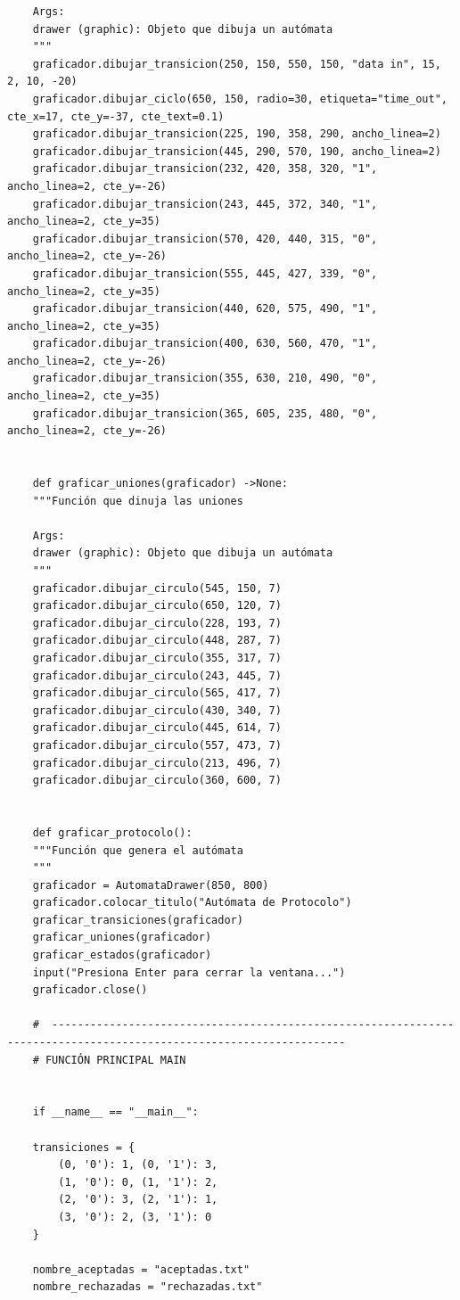 \documentclass[11pt]{article} %
\begin{document}
\begin{lstlisting}
	Args:
	drawer (graphic): Objeto que dibuja un autómata
	"""
	graficador.dibujar_transicion(250, 150, 550, 150, "data in", 15, 2, 10, -20)
	graficador.dibujar_ciclo(650, 150, radio=30, etiqueta="time_out", cte_x=17, cte_y=-37, cte_text=0.1)
	graficador.dibujar_transicion(225, 190, 358, 290, ancho_linea=2)
	graficador.dibujar_transicion(445, 290, 570, 190, ancho_linea=2)
	graficador.dibujar_transicion(232, 420, 358, 320, "1", ancho_linea=2, cte_y=-26)
	graficador.dibujar_transicion(243, 445, 372, 340, "1", ancho_linea=2, cte_y=35)
	graficador.dibujar_transicion(570, 420, 440, 315, "0", ancho_linea=2, cte_y=-26)
	graficador.dibujar_transicion(555, 445, 427, 339, "0", ancho_linea=2, cte_y=35)
	graficador.dibujar_transicion(440, 620, 575, 490, "1", ancho_linea=2, cte_y=35)
	graficador.dibujar_transicion(400, 630, 560, 470, "1", ancho_linea=2, cte_y=-26)
	graficador.dibujar_transicion(355, 630, 210, 490, "0", ancho_linea=2, cte_y=35)
	graficador.dibujar_transicion(365, 605, 235, 480, "0", ancho_linea=2, cte_y=-26)
	
	
	def graficar_uniones(graficador) ->None:
	"""Función que dinuja las uniones
	
	Args:
	drawer (graphic): Objeto que dibuja un autómata
	"""
	graficador.dibujar_circulo(545, 150, 7)
	graficador.dibujar_circulo(650, 120, 7)
	graficador.dibujar_circulo(228, 193, 7)
	graficador.dibujar_circulo(448, 287, 7)
	graficador.dibujar_circulo(355, 317, 7)
	graficador.dibujar_circulo(243, 445, 7)
	graficador.dibujar_circulo(565, 417, 7)
	graficador.dibujar_circulo(430, 340, 7)
	graficador.dibujar_circulo(445, 614, 7)
	graficador.dibujar_circulo(557, 473, 7)
	graficador.dibujar_circulo(213, 496, 7)
	graficador.dibujar_circulo(360, 600, 7)
	
	
	def graficar_protocolo():
	"""Función que genera el autómata
	"""
	graficador = AutomataDrawer(850, 800)
	graficador.colocar_titulo("Autómata de Protocolo")
	graficar_transiciones(graficador)
	graficar_uniones(graficador)
	graficar_estados(graficador)
	input("Presiona Enter para cerrar la ventana...")
	graficador.close()
	
	#  --------------------------------------------------------------------------------------------------------------------
	# FUNCIÓN PRINCIPAL MAIN
	
	
	if __name__ == "__main__":
	
	transiciones = {
		(0, '0'): 1, (0, '1'): 3,
		(1, '0'): 0, (1, '1'): 2,
		(2, '0'): 3, (2, '1'): 1,
		(3, '0'): 2, (3, '1'): 0
	}
	
	nombre_aceptadas = "aceptadas.txt"
	nombre_rechazadas = "rechazadas.txt"
	

\end{lstlisting}
\end{document}
